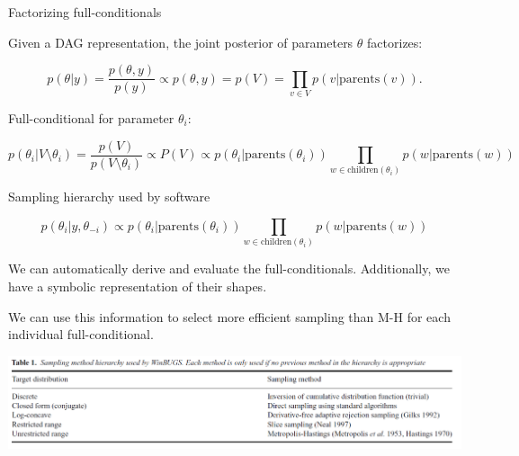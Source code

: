 \begin{frame}{Factorizing full-conditionals}

\begin{small}

Given a DAG representation, the joint posterior of parameters $\theta$ factorizes:

$$ p(\theta | y) = \frac{p(\theta, y)}{p(y)} \propto p( \theta, y) = p(V) = \prod_{v \in V} p\left(v|\text{parents}(v)\right).$$

\bigskip

\bigskip

Full-conditional for parameter $\theta_i$:

$$p(\theta_i | V \setminus \theta_i) = \frac{p(V)}{p(V\setminus \theta_i)} \propto P(V) \propto p(\theta_i|\text{parents}(\theta_i)) \prod_{w \in \text{children}(\theta_i)}  p(w|\text{parents}(w))$$
\end{small}
\end{frame}


\begin{frame}{Sampling hierarchy used by software}

\begin{small}
\bigskip

$$p(\theta_i | y, \theta_{-i}) \propto p(\theta_i|\text{parents}(\theta_i)) \prod_{w \in \text{children}(\theta_i)}  p(w|\text{parents}(w))$$

\bigskip
\end{small}

We can automatically derive and evaluate the full-conditionals. Additionally, we have a symbolic representation of their shapes.

\bigskip

We can use this information to select more efficient sampling than M-H for each individual full-conditional.

\bigskip


\begin{center}
\includegraphics[scale=.37]{../LectureAssets/L07/WinBugsHierarchy}
\end{center}
\bigskip

\end{frame}



